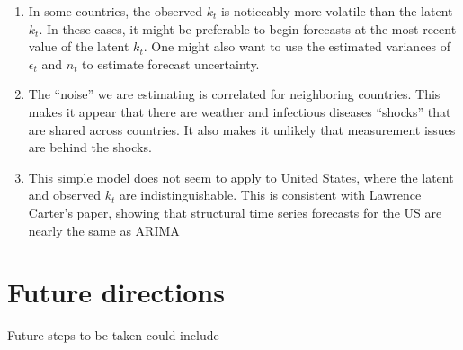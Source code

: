 \documentclass[12pt]{article}
\begin{document}
\begin{enumerate}

  \item In some countries, the observed $k_t$ is noticeably more
    volatile than the latent $k_t$. In these cases, it might be
    preferable to begin forecasts at the most recent value of the
    latent $k_t$. One might also want to use the estimated variances
    of $\epsilon_t$ and $n_t$ to estimate forecast uncertainty.

  \item The ``noise'' we are estimating is correlated for neighboring
    countries. This makes it appear that there are weather and
    infectious diseases ``shocks'' that are shared across
    countries. It also makes it unlikely that measurement issues are
    behind the shocks.

  \item This simple model does not seem to apply to United States,
    where the latent and observed $k_t$ are indistinguishable. This is
    consistent with Lawrence Carter's paper, showing that structural
    time series forecasts for the US are nearly the same as ARIMA


\end{enumerate}

\section{Future directions}

Future steps to be taken could include
\end{document}
